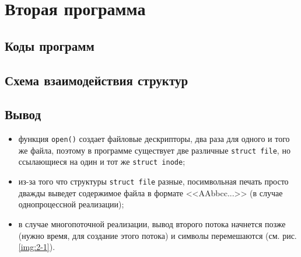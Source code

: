 \section{Вторая программа}

\subsection{Коды программ}



\clearpage



\clearpage

\subsection{Схема взаимодействия структур}


\subsection*{Вывод}

\begin{itemize}
	\item функция \texttt{open()} создает файловые дескрипторы, два раза для одного и того же файла, поэтому в программе существует две различные \texttt{struct file}, но ссылающиеся на один и тот же \texttt{struct inode};
	\item из-за того что структуры \texttt{struct file} разные, посимвольная печать просто дважды выведет содержимое файла в формате <<AAbbcc...>> (в случае однопроцессной реализации); 
	\item в случае многопоточной реализации, вывод второго потока начнется позже (нужно время, для создание этого потока) и символы перемешаются (см. рис. \ref{img:2-1}).
\end{itemize}

\clearpage

